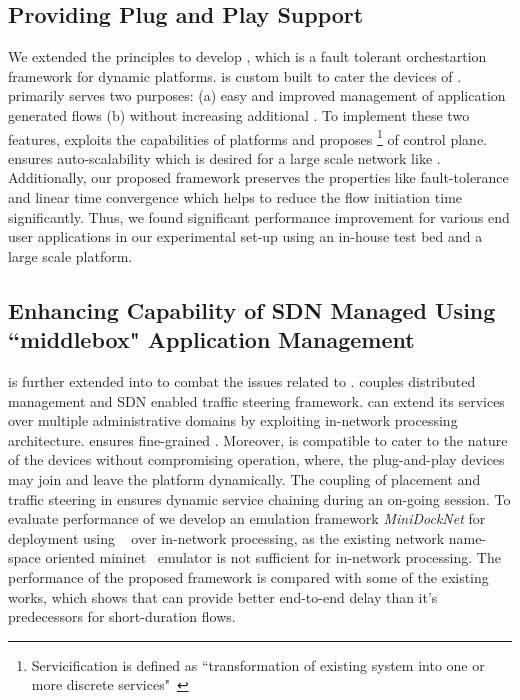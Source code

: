 \subsection{Providing Plug and Play Support}
 We extended the  principles to develop , which is a fault tolerant  orchestartion framework for dynamic  platforms.  is custom built to cater the  devices of .  primarily serves two purposes: (a) easy and improved management of  application generated flows (b) without increasing additional . To implement these two features,  exploits the capabilities of  platforms and proposes \footnote{Servicification is defined as ``transformation of existing system into one or more discrete services"~\cite{define:servicification}} of control plane.  ensures auto-scalability which is desired for a large scale network like . Additionally, our proposed framework preserves the  properties like fault-tolerance and linear time convergence which helps to reduce the flow initiation time significantly. Thus, we found significant performance improvement for various end user applications in our experimental set-up using an in-house test bed and a large scale  platform. 
\subsection{Enhancing Capability of SDN Managed  Using ``middlebox" Application Management}
 is further extended into  to combat the issues related to .  couples distributed  management and SDN enabled traffic steering framework.  can extend its services over multiple administrative domains by exploiting in-network processing~\cite{10.1007/978-3-030-19759-9_6,225992} architecture.  ensures fine-grained . Moreover,  is compatible to cater to the  nature of the devices without compromising operation, where, the plug-and-play devices may join and leave the platform dynamically. The coupling of  placement and traffic steering in  ensures dynamic service chaining during an on-going session. To evaluate performance of  we develop an emulation framework \emph{MiniDockNet} for  deployment using ~\cite{docker} over in-network processing, as the existing network name-space oriented mininet~\cite{Lantz:2010:NLR:1868447.1868466} emulator is not sufficient for in-network processing. The performance of the proposed framework is compared with some of the existing works, which shows that  can provide better end-to-end delay than it's predecessors for short-duration flows.
